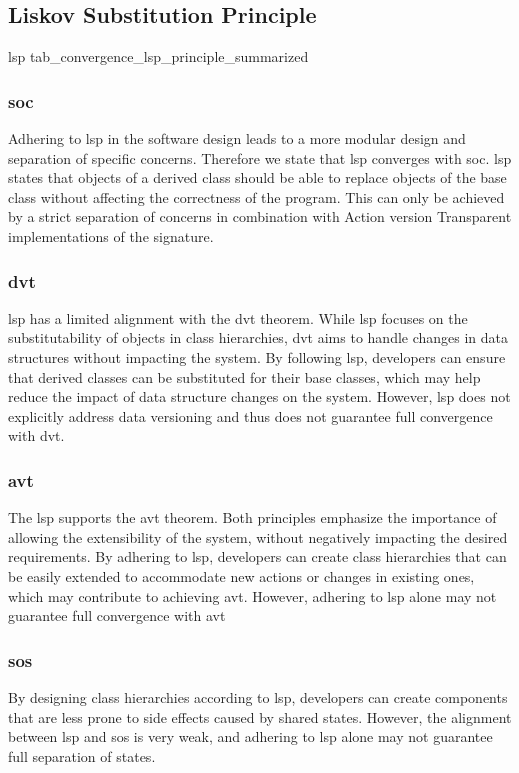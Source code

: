 \subsection{Liskov Substitution Principle}

\compareTable
{\acrlong*{lsp}}
{tab_convergence_lsp_principle_summarized}
{\addEvalRow{\conv & \noconv & \partconv & \noconv}}

\subsubsection{\acrlong*{soc}}

Adhering to \gls{lsp} in the software design leads to a more modular design and separation
of specific concerns. Therefore we state that \gls{lsp} converges with \gls{soc}.
\gls{lsp} states that objects of a derived class should be able to replace objects of the
base class without affecting the correctness of the program. This can only be achieved by
a strict separation of concerns in combination with Action version Transparent
implementations of the signature.

\subsubsection{\acrlong*{dvt}} 

\gls{lsp} has a limited alignment with the \gls{dvt} theorem. While \gls{lsp} focuses on
the substitutability of objects in class hierarchies, \gls{dvt} aims to handle changes in
data structures without impacting the system. By following \gls{lsp}, developers can
ensure that derived classes can be substituted for their base classes, which may help
reduce the impact of data structure changes on the system. However, \gls{lsp} does not
explicitly address data versioning and thus does not guarantee full convergence with
\gls{dvt}.

\subsubsection{\acrlong*{avt}}

The \gls{lsp} supports the \gls{avt} theorem. Both principles emphasize the importance of
allowing the extensibility of the system, without negatively impacting the desired
requirements. By adhering to \gls{lsp}, developers can create class hierarchies that can
be easily extended to accommodate new actions or changes in existing ones, which may
contribute to achieving \gls{avt}. However, adhering to \gls{lsp} alone may not guarantee
full convergence with \gls{avt}

\subsubsection{\acrlong*{sos}}

By designing class hierarchies according to \gls{lsp}, developers can create components
that are less prone to side effects caused by shared states. However, the alignment
between \gls{lsp} and \gls{sos} is very weak, and adhering to \gls{lsp} alone may not
guarantee full separation of states.
